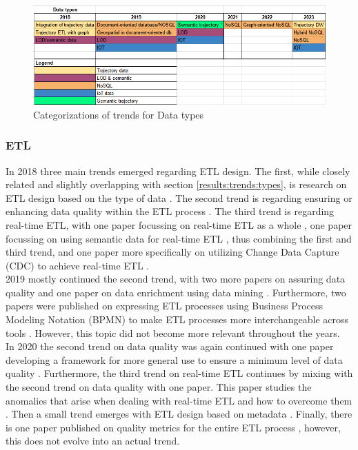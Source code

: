 \documentclass[11pt]{article}
\begin{document}
\begin{figure}
\centering
\includegraphics[scale=0.75]{Images/Types.png}
\caption{Categorizations of trends for Data types}
\label{fig:types}
\end{figure}

\subsubsection{ETL}
\label{results:trends:ETL}
In 2018 three main trends emerged regarding ETL design. The first, while closely related and slightly overlapping with section \ref{results:trends:types}, is research on ETL design based on the type of data \cite{Mallek2018798, Teixeira2018225, Berkani201898}. The second trend is regarding ensuring or enhancing data quality within the ETL process \cite{Pan2018275}. The third trend is regarding real-time ETL, with one paper focussing on real-time ETL as a whole \cite{MohammedMuddasir2018436}, one paper focussing on using semantic data for real-time ETL \cite{Berkani20181}, thus combining the first and third trend, and one paper more specifically on utilizing Change Data Capture (CDC) to achieve real-time ETL \cite{Chandra2018}. \\

2019 mostly continued the second trend, with two more papers on assuring data quality \cite{Amuthabala2019233, Sreemathy20191183} and one paper on data enrichment using data mining \cite{Madhikerrni2019174}. Furthermore, two papers were published on expressing ETL processes using Business Process Modeling Notation (BPMN) to make ETL processes more interchangeable across tools \cite{Awiti2019299, Awiti2019427}. However, this topic did not become more relevant throughout the years. \\

In 2020 the second trend on data quality was again continued with one paper developing a framework for more general use to ensure a minimum level of data quality \cite{Ali2020}. Furthermore, the third trend on real-time ETL continues by mixing with the second trend on data quality with one paper. This paper studies the anomalies that arise when dealing with real-time ETL and how to overcome them \cite{MohammedMuddasir2020545}. Then a small trend emerges with ETL design based on metadata \cite{Wang2020}. Finally, there is one paper published on quality metrics for the entire ETL process \cite{Saebao2020539}, however, this does not evolve into an actual trend. \\
\end{document}
